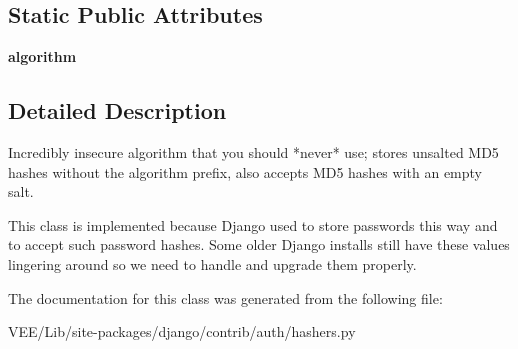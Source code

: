 \subsection*{Static Public Attributes}
\begin{DoxyCompactItemize}
\item 
\mbox{\label{classdjango_1_1contrib_1_1auth_1_1hashers_1_1_unsalted_m_d5_password_hasher_adca1b126dbe043a90144557113a37981}} 
{\bfseries algorithm}
\end{DoxyCompactItemize}


\subsection{Detailed Description}
\begin{DoxyVerb}Incredibly insecure algorithm that you should *never* use; stores unsalted
MD5 hashes without the algorithm prefix, also accepts MD5 hashes with an
empty salt.

This class is implemented because Django used to store passwords this way
and to accept such password hashes. Some older Django installs still have
these values lingering around so we need to handle and upgrade them
properly.
\end{DoxyVerb}
 

The documentation for this class was generated from the following file\+:\begin{DoxyCompactItemize}
\item 
V\+E\+E/\+Lib/site-\/packages/django/contrib/auth/hashers.\+py\end{DoxyCompactItemize}
